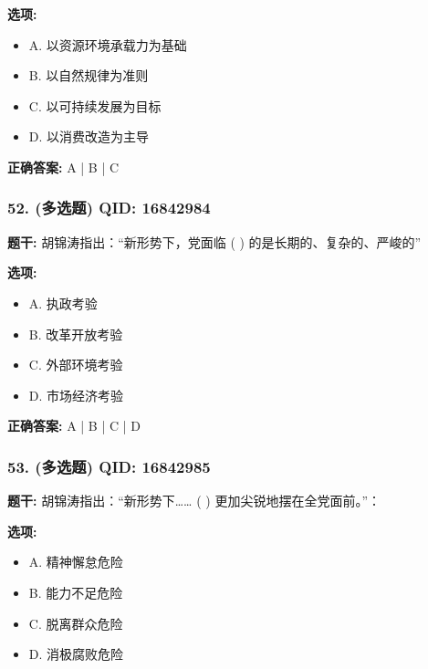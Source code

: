\documentclass[12pt,UTF8]{ctexart}
\begin{document}
\textbf{选项:}
\begin{itemize}[leftmargin=*]

  \item A. 以资源环境承载力为基础

  \item B. 以自然规律为准则

  \item C. 以可持续发展为目标

  \item D. 以消费改造为主导

\end{itemize}

\textbf{正确答案:}
A | B | C

\vspace{0.3em}\hrulefill\vspace{0.7em}

\subsubsection*{52. (多选题) \small QID: 16842984}

\textbf{题干:}
胡锦涛指出：“新形势下，党面临 ( ) 的是长期的、复杂的、严峻的”

\textbf{选项:}
\begin{itemize}[leftmargin=*]

  \item A. 执政考验

  \item B. 改革开放考验

  \item C. 外部环境考验

  \item D. 市场经济考验

\end{itemize}

\textbf{正确答案:}
A | B | C | D

\vspace{0.3em}\hrulefill\vspace{0.7em}

\subsubsection*{53. (多选题) \small QID: 16842985}

\textbf{题干:}
胡锦涛指出：“新形势下……  ( ) 更加尖锐地摆在全党面前。”：

\textbf{选项:}
\begin{itemize}[leftmargin=*]

  \item A. 精神懈怠危险

  \item B. 能力不足危险

  \item C. 脱离群众危险

  \item D. 消极腐败危险

\end{itemize}
\end{document}
